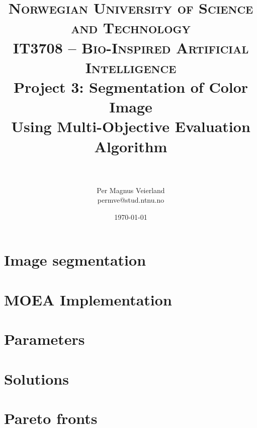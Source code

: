 \documentclass[paper=a4, fontsize=9pt]{scrartcl}
\title{
\vspace{-1cm}
\normalfont \normalsize
\textsc{Norwegian University of Science and Technology\\IT3708 -- Bio-Inspired Artificial Intelligence}
\horrule{0.5pt} \\[0cm]
\Huge Project 3: Segmentation of Color Image\\Using Multi-Objective Evaluation Algorithm\\[-0.3cm]
\horrule{2pt} \\[0.1cm]
}
\author{Per Magnus Veierland\\permve@stud.ntnu.no}
\date{\normalsize\today}
\begin{document}
\maketitle

\begin{multicols}{2}

\section*{Image segmentation}


\section*{MOEA Implementation}


\section*{Parameters}


\section*{Solutions}



\section*{Pareto fronts}






\end{multicols}
\end{document}

